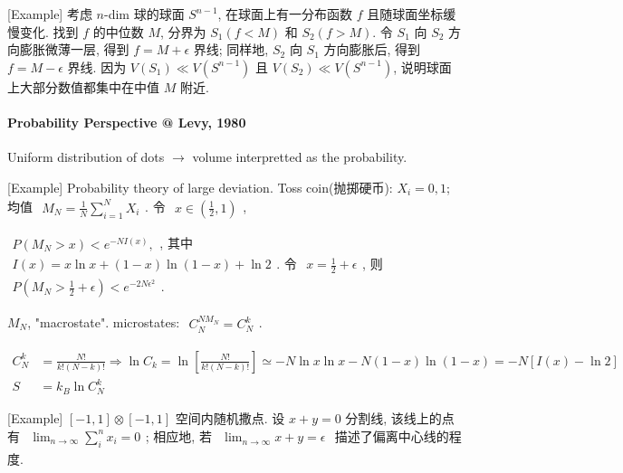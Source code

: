 \documentclass[../../main.tex]{subfiles}
\begin{document}
[Example] 考虑 $n$-dim 球的球面 $S^{n-1}$, 在球面上有一分布函数 $f$ 且随球面坐标缓慢变化. 找到 $f$ 的中位数 $M$, 分界为 $S_{1}(f<M)$ 和 $S_{2}(f>M)$. 令 $S_{1}$ 向 $S_{2}$ 方向膨胀微薄一层, 得到 $f = M+\epsilon$ 界线; 同样地, $S_{2}$ 向 $S_{1}$ 方向膨胀后, 得到 $f = M-\epsilon$ 界线. 因为 $V(S_{1})\ll V(S^{n-1})$ 且 $V(S_{2})\ll V(S^{n-1})$, 说明球面上大部分数值都集中在中值 $M$ 附近.

\paragraph{Probability Perspective @ Levy, 1980} Uniform distribution of dots $\rightarrow$ volume interpretted as the probability. 

[Example] Probability theory of large deviation. Toss coin(抛掷硬币): $X_{i} = 0,1$; 均值 $\begin{aligned}
    M_{N} = \frac{1}{N}\sum_{i=1}^{N}X_{i}
\end{aligned}$. 令 $\begin{aligned}
    x\in\left(\frac{1}{2},1\right)
\end{aligned}$, 

$\begin{aligned}
    P(M_{N}>x) < e^{-NI(x)},
\end{aligned}$, 其中 $\begin{aligned}
    I(x) = x\ln{x} + (1-x)\ln{(1-x)} + \ln{2}
\end{aligned}$. 令 $\begin{aligned}
    x = \frac{1}{2}+\epsilon
\end{aligned}$, 则 $\begin{aligned}
    P(M_{N}>\frac{1}{2}+\epsilon) < e^{-2N\epsilon^{2}}
\end{aligned}$. 

$M_{N}$, "macrostate". microstates: $\begin{aligned}
    C_{N}^{NM_{N}} = C_{N}^{k}
\end{aligned}$. 

$\begin{aligned}
    C_{N}^{k} &= \frac{N!}{k!(N-k)!}\Rightarrow
    \ln{C_{k}} = \ln{\left[\frac{N!}{k!(N-k)!}\right]} \simeq -N\ln{x}\ln{x} - N(1-x)\ln{(1-x)} = -N[I(x)-\ln{2}]\\
    S &= k_{B}\ln{C_{N}^{k}}
\end{aligned}$

[Example] $[-1,1]\otimes [-1,1]$ 空间内随机撒点. 设 $x+y=0$ 分割线, 该线上的点有 $\begin{aligned}
    \lim_{n\rightarrow\infty}\sum_{i}^{n}x_{i}=0
\end{aligned}$; 相应地, 若 $\begin{aligned}
    \lim_{n\rightarrow\infty}x+y=\epsilon
\end{aligned}$ 描述了偏离中心线的程度.
\end{document}
